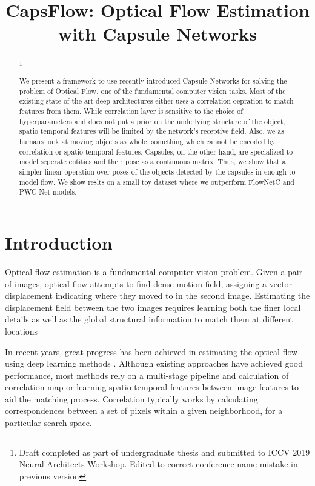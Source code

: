 \documentclass[11pt]{article}
\title{CapsFlow: Optical Flow Estimation with Capsule Networks}
\newcommand\blfootnote[1]{%
  \begingroup
  \renewcommand\thefootnote{}\footnote{#1}%
  \addtocounter{footnote}{-1}%
  \endgroup
}
\begin{document}
\maketitle
\begin{abstract}
\blfootnote{Draft completed as part of undergraduate thesis and submitted to ICCV 2019 Neural Architects Workshop. Edited to correct conference name mistake in previous version}
We present a framework to use recently introduced Capsule Networks for solving the problem of Optical Flow, one of the fundamental computer vision tasks. Most of the existing state of the art deep architectures either uses a correlation oepration to match features from them. While correlation layer is sensitive to the choice of hyperparameters and does not put a prior on the underlying structure of the object, spatio temporal features will be limited by the network's receptive field. Also, we as humans look at moving objects as whole, something which cannot be encoded by correlation or spatio temporal features. Capsules, on the other hand, are specialized to model seperate entities and their pose as a continuous matrix. Thus, we show that a simpler linear operation over poses of the objects detected by the capsules in enough to model flow. We show reslts on a small toy dataset where we outperform FlowNetC and PWC-Net models.
\end{abstract}

\section{Introduction}

Optical flow estimation is a fundamental computer vision problem. Given a pair of images, optical flow attempts to find dense motion field, assigning a vector displacement indicating where they moved to in the second image. Estimating the displacement field between the two images requires learning both the finer local details as well as the global structural information to match them at different locations

In recent years, great progress has been achieved in estimating the optical flow using deep learning methods \cite{3, 7, 11, 15}. Although existing approaches have achieved good performance, most methods rely on a multi-stage pipeline and calculation of correlation map or learning spatio-temporal features between image features to aid the matching process. Correlation typically works by calculating correspondences between a set of pixels within a given neighborhood, for a particular search space.
\end{document}
